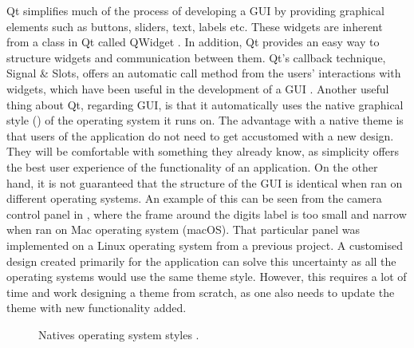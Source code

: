 Qt simplifies much of the process of developing a GUI by providing graphical elements such as buttons, sliders, text, labels etc. These widgets are inherent from a class in Qt called QWidget \cite{qwidget}. In addition, Qt provides an easy way to structure widgets and communication between them. Qt's callback technique, Signal \& Slots, offers an automatic call method from the users' interactions with widgets, which have been useful in the development of a GUI \cite{signalslots}. Another useful thing about Qt, regarding GUI, is that it automatically uses the native graphical style () of the operating system it runs on. The advantage with a native theme is that users of the application do not need to get accustomed with a new design. They will be comfortable with something they already know, as simplicity offers the best user experience of the functionality of an application. On the other hand, it is not guaranteed that the structure of the GUI is identical when ran on different operating systems. An example of this can be seen from the camera control panel in , where the frame around the digits label is too small and narrow when ran on Mac operating system (macOS). That particular panel was implemented on a Linux operating system from a previous project. A customised design created primarily for the application can solve this uncertainty as all the operating systems would use the same theme style. However, this requires a lot of time and work designing a theme from scratch, as one also needs to update the theme with new functionality added.

\begin{figure}[ht]
  \centering
  \hfill
  \hfill
  \caption[Native operating system styles \cite{qstyle}]{Natives operating system styles \cite{qstyle}.}
  \label{fig:qstyle}
\end{figure}


